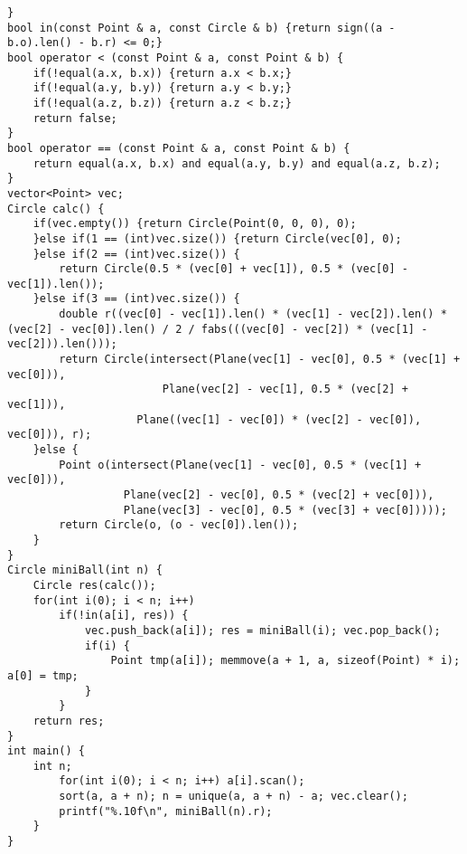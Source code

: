 \documentclass[landscape,a4paper]{article}
\begin{document}
\begin{spacing}{0.3}
\begin{multicols}{2}
\begin{lstlisting}
}
bool in(const Point & a, const Circle & b) {return sign((a - b.o).len() - b.r) <= 0;}	
bool operator < (const Point & a, const Point & b) {
	if(!equal(a.x, b.x)) {return a.x < b.x;}
	if(!equal(a.y, b.y)) {return a.y < b.y;}
	if(!equal(a.z, b.z)) {return a.z < b.z;}
	return false;
}
bool operator == (const Point & a, const Point & b) {
	return equal(a.x, b.x) and equal(a.y, b.y) and equal(a.z, b.z);
}
vector<Point> vec;
Circle calc() {
	if(vec.empty()) {return Circle(Point(0, 0, 0), 0);
	}else if(1 == (int)vec.size()) {return Circle(vec[0], 0);
	}else if(2 == (int)vec.size()) {
		return Circle(0.5 * (vec[0] + vec[1]), 0.5 * (vec[0] - vec[1]).len());
	}else if(3 == (int)vec.size()) {
		double r((vec[0] - vec[1]).len() * (vec[1] - vec[2]).len() * (vec[2] - vec[0]).len() / 2 / fabs(((vec[0] - vec[2]) * (vec[1] - vec[2])).len()));
		return Circle(intersect(Plane(vec[1] - vec[0], 0.5 * (vec[1] + vec[0])),
				       	Plane(vec[2] - vec[1], 0.5 * (vec[2] + vec[1])),
					Plane((vec[1] - vec[0]) * (vec[2] - vec[0]), vec[0])), r);
	}else {
		Point o(intersect(Plane(vec[1] - vec[0], 0.5 * (vec[1] + vec[0])),
				  Plane(vec[2] - vec[0], 0.5 * (vec[2] + vec[0])),
				  Plane(vec[3] - vec[0], 0.5 * (vec[3] + vec[0]))));
		return Circle(o, (o - vec[0]).len());
	}
}
Circle miniBall(int n) {
	Circle res(calc());
	for(int i(0); i < n; i++)
		if(!in(a[i], res)) {
			vec.push_back(a[i]); res = miniBall(i); vec.pop_back();
			if(i) {
				Point tmp(a[i]); memmove(a + 1, a, sizeof(Point) * i); a[0] = tmp;
			}
		}
	return res;
}
int main() {
	int n;
		for(int i(0); i < n; i++) a[i].scan();
		sort(a, a + n); n = unique(a, a + n) - a; vec.clear();
		printf("%.10f\n", miniBall(n).r);
	}
}
\end{lstlisting}

\end{multicols}
\end{spacing}
\end{document}
